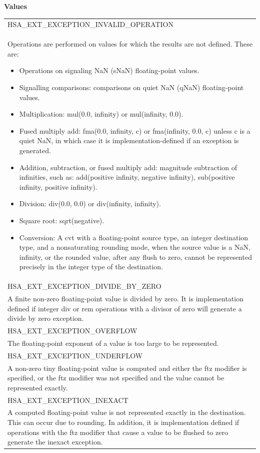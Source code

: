 \documentclass[final]{book}
\newcommand{\reftyp}[1]{#1}
\newcommand{\refenu}[1]{\reftyp{#1}}
\begin{document}
\noindent\textbf{Values}\\[-5mm]
\begin{longtable}{@{\hspace{2em}}p{\linewidth-2em}}
\hspace{-2em}\refenu{HSA_\-EXT_\-EXCEPTION_\-INVALID_\-OPERATION}\\Operations are performed on values for which the results are not defined. These are:
\begin{itemize}\item Operations on signaling NaN (sNaN) floating-point values.
\item Signalling comparisons: comparisons on quiet NaN (qNaN) floating-point values.
\item Multiplication: mul(0.0, infinity) or mul(infinity, 0.0).
\item Fused multiply add: fma(0.0, infinity, c) or fma(infinity, 0.0, c) unless c is a quiet NaN, in which case it is implementation-defined if an exception is generated.
\item Addition, subtraction, or fused multiply add: magnitude subtraction of infinities, such as: add(positive infinity, negative infinity), sub(positive infinity, positive infinity).
\item Division: div(0.0, 0.0) or div(infinity, infinity).
\item Square root: sqrt(negative).
\item Conversion: A cvt with a floating-point source type, an integer destination type, and a nonsaturating rounding mode, when the source value is a NaN, infinity, or the rounded value, after any flush to zero, cannot be represented precisely in the integer type of the destination. 
\end{itemize}\\[2mm]
\hspace{-2em}\refenu{HSA_\-EXT_\-EXCEPTION_\-DIVIDE_\-BY_\-ZERO}\\A finite non-zero floating-point value is divided by zero. It is implementation defined if integer div or rem operations with a divisor of zero will generate a divide by zero exception.\\[2mm]
\hspace{-2em}\refenu{HSA_\-EXT_\-EXCEPTION_\-OVERFLOW}\\The floating-point exponent of a value is too large to be represented.\\[2mm]
\hspace{-2em}\refenu{HSA_\-EXT_\-EXCEPTION_\-UNDERFLOW}\\A non-zero tiny floating-point value is computed and either the ftz modifier is specified, or the ftz modifier was not specified and the value cannot be represented exactly.\\[2mm]
\hspace{-2em}\refenu{HSA_\-EXT_\-EXCEPTION_\-INEXACT}\\A computed floating-point value is not represented exactly in the destination. This can occur due to rounding. In addition, it is implementation defined if operations with the ftz modifier that cause a value to be flushed to zero generate the inexact exception.
\end{longtable}
\end{document}
